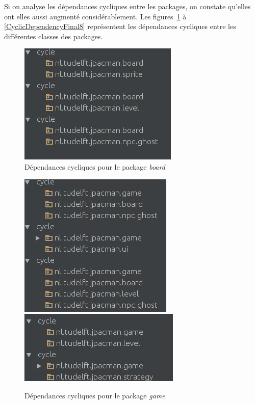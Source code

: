 \documentclass[12pt, openany]{report}
\begin{document}
\newpage


Si on analyse les dépendances cycliques entre les packages, on constate qu'elles ont elles aussi augmenté considérablement. Les figures~\ref{CyclicDependencyFinal1} à \ref{CyclicDependencyFinal8} représentent les dépendances cycliques entre les différentes classes des packages.

\begin{figure}[!h]
	\centering
	\includegraphics[scale=0.6]{Images/CyclicDependencyFinal1.png}  
		\caption{Dépendances cycliques pour le package \textit{board}}
	\label{CyclicDependencyFinal1}
\end{figure}

\begin{figure}[!h]
	\centering
	\includegraphics[scale=0.6]{Images/CyclicDependencyFinal2.png} 
	\includegraphics[scale=0.6]{Images/CyclicDependencyFinal3.png}   
		\caption{Dépendances cycliques pour le package \textit{game}}
	\label{CyclicDependencyFinal2}
\end{figure}
\end{document}

